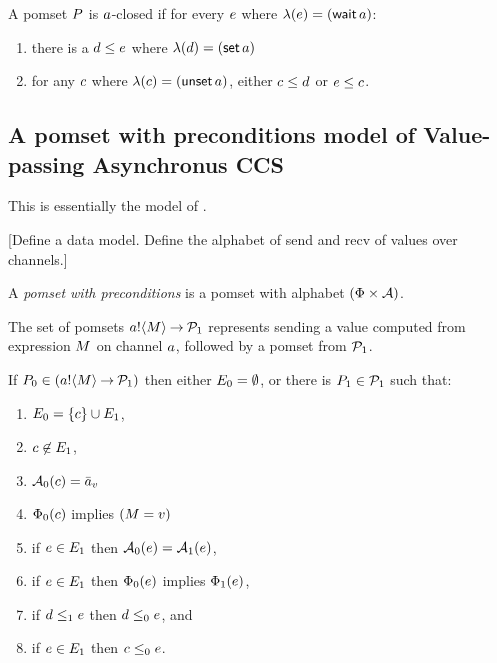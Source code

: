 \begin{definition}
  A pomset $P$ is $a$-closed if
  for every $e$ where $\lambda(e)=(\mathsf{wait}\,a)$:
  \begin{enumerate}
  \item there is a $d\le e$ where $\lambda(d)=(\mathsf{set}\,a)$
  \item for any $c$ where $\lambda(c)=(\mathsf{unset}\,a)$,
    either $c\le d$ or $e\le c$.
  \end{enumerate}
\end{definition}

\subsection{A pomset with preconditions model of Value-passing Asynchronus CCS}

This is essentially the model of \cite{10.1145/3428262}.

[Define a data model. Define the alphabet of send and recv of values over channels.]

\begin{definition}
  A \emph{pomset with preconditions} is
  a pomset with alphabet $(\Phi \times \mathcal{A})$.
\end{definition}

The set of pomsets $\sSEND\aChan\aExp\sPREFIX\aPSS_1$ represents sending a value computed from expression $M$ on channel $a$,
followed by a pomset from $\mathcal{P}_1$.
\begin{definition}
  If $\aPS_0 \in (\sSEND\aChan\aExp\sPREFIX\aPSS_1)$ then either $E_0=\emptyset$, or there is $P_1\in\mathcal{P}_1$ such that:
  \begin{enumerate}
  \item $E_0 = \{c\} \cup E_1$,
  \item $c\not\in E_1$,
  \item $\mathcal{A}_0(c) = \bar{a}_{v}$
  \item $\Phi_0(c)$ implies $(M=v)$
  \item if $e\in E_1$ then $\mathcal{A}_0(e) = \mathcal{A}_1(e)$,
  \item if $e\in E_1$ then $\Phi_0(e)$ implies $\Phi_1(e)$,
  \item if $d\le_1e$ then $d\le_0e$, and
  \item if $e\in E_1$ then $c\le_0e$.
  \end{enumerate}
\end{definition}

